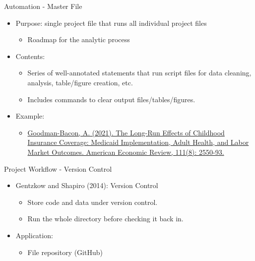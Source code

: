 \documentclass{beamer}
\begin{document}
\begin{frame}{Automation - Master File}
    \begin{itemize}
        \item Purpose: single project file that runs all individual project files
            \begin{itemize}
                \item Roadmap for the analytic process
            \end{itemize}
        \medskip
        \item Contents:
            \begin{itemize}
                \item Series of well-annotated statements that run script files for data cleaning, analysis, table/figure creation, etc.
                \item Includes commands to clear output files/tables/figures.
            \end{itemize}
        \medskip
        \pause\item Example:
            \begin{itemize}
                \item \color{blue} \href{https://github.com/k-callison/hpam7660-sp24/blob/main/resources/agb_masterfile.pdf}{Goodman-Bacon, A. (2021). The Long-Run Effects of Childhood Insurance Coverage: Medicaid Implementation, Adult Health, and Labor Market Outcomes. American Economic Review, 111(8): 2550-93.}
            \end{itemize}
    \end{itemize}
\end{frame}

\begin{frame}{Project Workflow - Version Control}
    \begin{itemize}
        \item Gentzkow and Shapiro (2014): Version Control
            \begin{itemize}
                \item Store code and data under version control.
                \item Run the whole directory before checking it back in.
            \end{itemize}
        \medskip
        \item Application:
            \begin{itemize}
                \item File repository (GitHub)
            \end{itemize}
    \end{itemize}
\end{frame}
\end{document}
